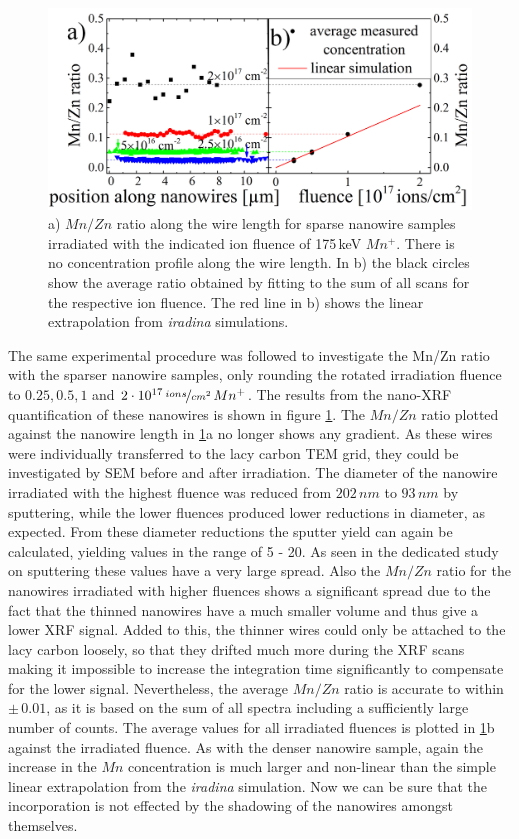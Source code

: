 \begin{figure}
	\centering
		\includegraphics[width=.85\textwidth]{images/MnZn2.png}
	\caption{a) $Mn/Zn$ ratio along the wire length for sparse nanowire samples irradiated with the indicated ion fluence of 175\,keV $Mn^+$. There is no concentration profile along the wire length. In b) the black circles show the average ratio obtained by fitting to the sum of all scans for the respective ion fluence. The red line in b) shows the linear extrapolation from \emph{iradina} simulations. }
	\label{MnZn2}
\end{figure} 

The same experimental procedure was followed to investigate the Mn/Zn ratio with the sparser nanowire samples, only rounding the rotated irradiation fluence to $0.25, 0.5, 1$ and $2\cdot 10^{17}\,\nicefrac{ions}{cm^2}\,Mn^+$. The results from the nano-XRF quantification of these nanowires is shown in figure \ref{MnZn2}. The $Mn/Zn$ ratio plotted against the nanowire length in \ref{MnZn2}a no longer shows any gradient. As these wires were individually transferred to the lacy carbon TEM grid, they could be investigated by SEM before and after irradiation. The diameter of the nanowire irradiated with the highest fluence was reduced from $202\,nm$ to $93\,nm$ by sputtering, while the lower fluences produced lower reductions in diameter, as expected. From these diameter reductions the sputter yield can again be calculated, yielding values in the range of 5 - 20. As seen in the dedicated study on sputtering these values have a very large spread. Also the $Mn/Zn$ ratio for the nanowires irradiated with higher fluences shows a significant spread due to the fact that the thinned nanowires have a much smaller volume and thus give a lower XRF signal. Added to this, the thinner wires could only be attached to the lacy carbon loosely, so that they drifted much more during the XRF scans making it impossible to increase the integration time significantly to compensate for the lower signal. Nevertheless, the average $Mn/Zn$ ratio is accurate to within $\pm\,0.01$, as it is based on the sum of all spectra including a sufficiently large number of counts. The average values for all irradiated fluences is plotted in \ref{MnZn2}b against the irradiated fluence. As with the denser nanowire sample, again the increase in the $Mn$ concentration is much larger and non-linear than the simple linear extrapolation from the \emph{iradina} simulation. Now we can be sure that the incorporation is not effected by the shadowing of the nanowires amongst themselves.


